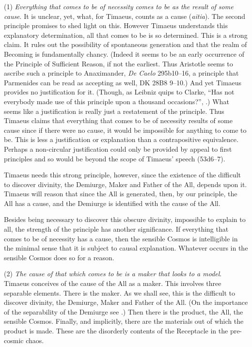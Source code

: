 (1) \emph{Everything that comes to be of necessity comes to be as the result of some cause}. It is unclear, yet, what, for Timaeus, counts as a cause (\emph{aitia}). The second principle promises to shed light on this. However Timaeus understands this explanatory determination, all that comes to be is so determined. This is a strong claim. It rules out the possibility of spontaneous generation and that the realm of Becoming is fundamentally chancy. (Indeed it seems to be an early occurrence of the Principle of Sufficient Reason, if not the earliest. Thus Aristotle seems to ascribe such a principle to Anaximander, \emph{De Caelo} 295b10--16, a principle that Parmenides can be read as accepting as well, DK 28B8 9--10.) And yet Timaeus provides no justification for it. (Though, as Leibniz quips to Clarke, ``Has not everybody made use of this principle upon a thousand occasions?'', \citealt[346]{Ariew:1989la}.) What seems like a justification is really just a restatement of the principle. Thus Timaeus claims that everything that comes to be of necessity results of some cause since if there were no cause, it would be impossible for anything to come to be. This is less a justification or explanation than a contrapositive equivalence. Perhaps a non-circular justification could only be provided by appeal to first principles and so would be beyond the scope of Timaeus' speech (53d6--7).

Timaeus needs this strong principle, however, since the existence of the difficult to discover divinity, the Demiurge, Maker and Father of the All, depends upon it. Timaeus will reason that since the All is generated, then, by our principle, the All has a cause, and the Demiurge is identified with the cause of the All. 

Besides being necessary to discover this obscure divinity, impossible to explain to all, the strength of the principle has another significance. If everything that comes to be of necessity has a cause, then the sensible Cosmos is intelligible in the minimal sense that it is subject to causal explanation. Whatever occurs in the sensible Cosmos does so for a reason.

(2) \emph{The cause of that which comes to be is a maker that looks to a model}. Timaeus conceives of the cause of the All as a maker. This involves three separable elements. There is the maker. As we shall see, this is the difficult to discover divinity, the Demiurge, Maker and Father of the All. (On the importance of the separability of the Demiurge see \citealt[chapter 1]{Broadie:2012vl}.) Then there is the product, the All, the sensible Cosmos. Finally, and implicitly, there are the materials out of which the product is made. These are the disorderly contents of the Receptacle in the pre-cosmic chaos. 

